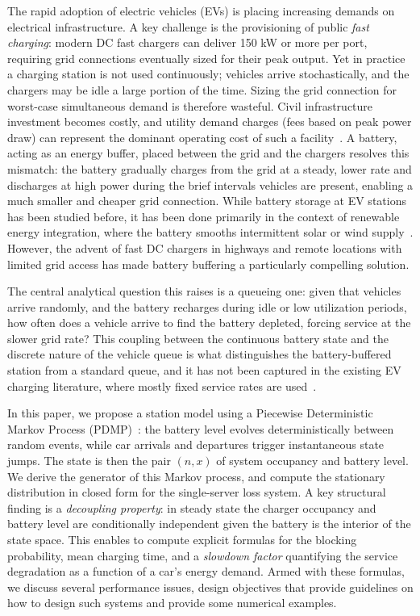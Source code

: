 \documentclass{sig-alternate-per-modified}
\begin{document}
The rapid adoption of electric vehicles (EVs) is placing increasing demands on electrical
infrastructure. A key challenge is the provisioning of public \emph{fast charging}: modern DC
fast chargers can deliver 150 \unit{\kilo\watt} or more per port, requiring grid connections eventually sized for
their peak output. Yet in practice a charging station is not used continuously; vehicles
arrive stochastically, and the chargers may be idle a large portion of the time. Sizing the grid
connection for worst-case simultaneous demand is therefore wasteful. Civil infrastructure
investment becomes costly, and utility demand charges (fees based on peak power draw)
can represent the dominant operating cost of such a facility~\cite{NREL2023}. A battery, acting as an energy buffer, placed between
the grid and the chargers resolves this mismatch: the battery gradually charges from the
grid at a steady, lower rate and discharges at high power during the brief intervals vehicles
are present, enabling a much smaller and cheaper grid connection. While battery storage
at EV stations has been studied before, it has been done primarily in the context of renewable energy integration,
where the battery smooths intermittent solar or wind supply~\cite{Bayram2011,Kabir2020,Tran2019,Tangetal2026}. However, the advent of fast DC chargers in highways and remote locations with limited grid access has made battery buffering a particularly compelling solution.

The central analytical question this raises is a queueing one: given that vehicles
arrive randomly, and the battery recharges during idle or low utilization periods, how often does a vehicle
arrive to find the battery depleted, forcing service at the slower grid rate? This
coupling between the continuous battery state and the discrete nature of the vehicle queue is what
distinguishes the battery-buffered station from a standard queue, and it has not
been captured in the existing EV charging literature, where mostly fixed service rates are used~\cite{Bayram2013,Dupont2023,Tan2014}.

In this paper, we propose a station model using a Piecewise Deterministic Markov Process
(PDMP)~\cite{Davis1984,Davis1993}: the battery level evolves deterministically between
random events, while car arrivals and departures trigger instantaneous state jumps.
The state is then the pair $(n, x)$ of system occupancy and battery level. We derive the generator
of this Markov process, and compute the stationary distribution in closed form for the single-server loss system. 
A key structural finding is a \emph{decoupling property}: in steady state the charger occupancy and battery level
are conditionally independent given the battery is the interior of the state space. This enables to compute explicit formulas for the blocking probability, mean charging time, and a \emph{slowdown factor} quantifying the service degradation as a function of a
car's energy demand. Armed with these formulas, we discuss several performance issues, design objectives that provide guidelines on how to design such systems and provide some numerical examples.
\end{document}
